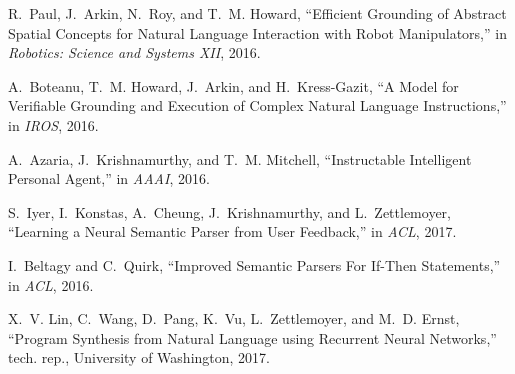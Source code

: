 \documentclass[letterpaper, 10 pt, conference]{ieeeconf}  %
\begin{document}
\begin{thebibliography}{10}
R.~Paul, J.~Arkin, N.~Roy, and T.~M. Howard, ``{Efficient Grounding of Abstract
  Spatial Concepts for Natural Language Interaction with Robot Manipulators},''
  in {\em Robotics: Science and Systems XII}, 2016.

A.~Boteanu, T.~M. Howard, J.~Arkin, and H.~Kress{-}Gazit, ``{A Model for
  Verifiable Grounding and Execution of Complex Natural Language
  Instructions},'' in {\em IROS}, 2016.

A.~Azaria, J.~Krishnamurthy, and T.~M. Mitchell, ``{Instructable Intelligent
  Personal Agent},'' in {\em AAAI}, 2016.

S.~Iyer, I.~Konstas, A.~Cheung, J.~Krishnamurthy, and L.~Zettlemoyer,
  ``{Learning a Neural Semantic Parser from User Feedback},'' in {\em ACL},
  2017.

I.~Beltagy and C.~Quirk, ``{Improved Semantic Parsers For If-Then
  Statements},'' in {\em ACL}, 2016.

X.~V. Lin, C.~Wang, D.~Pang, K.~Vu, L.~Zettlemoyer, and M.~D. Ernst, ``{Program
  Synthesis from Natural Language using Recurrent Neural Networks},'' tech.
  rep., University of Washington, 2017.

\end{thebibliography}
\end{document}

